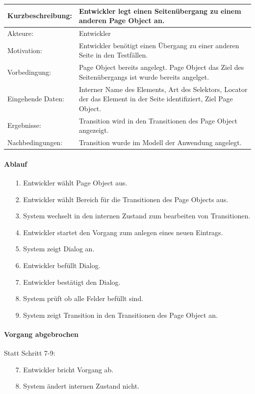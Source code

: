 \begin{tabular}[h]{|p{4cm}|p{}|}
\hline 
\rule[-1ex]{0pt}{2.5ex}Kurzbeschreibung: & 
Entwickler legt einen Seitenübergang zu einem anderen Page Object an. \\  
\hline 
\rule[-1ex]{0pt}{2.5ex}Akteure: & 
Entwickler \\ 
\hline 
\rule[-1ex]{0pt}{2.5ex}Motivation: & 
Entwickler benötigt einen Übergang zu einer anderen Seite in den Testfällen. \\ 
\hline 
\rule[-1ex]{0pt}{2.5ex}Vorbedingung: & 
Page Object bereits angelegt. Page Object das Ziel des Seitenübergangs ist wurde bereits angelget.\\ 
\hline 
\rule[-1ex]{0pt}{2.5ex}Eingehende Daten: & Interner Name des Elements, Art des Selektors, Locator der das Element in der Seite identifiziert, Ziel Page Object. \\ 
\hline 
\rule[-1ex]{0pt}{2.5ex}Ergebnisse: & Transition wird in den Transitionen des Page Object angezeigt. \\ 
\hline 
\rule[-1ex]{0pt}{2.5ex}Nachbedingungen: & Transition wurde im Modell der Anwendung angelegt.  \\ 
\hline 
\end{tabular} 

\paragraph{Ablauf}

\begin{itemize}[itemsep=0pt]
\item[1.] Entwickler wählt Page Object aus.
\item[2.] Entwickler wählt Bereich für die Transitionen des Page Objects aus. 
\item[3.] System wechselt in den internen Zustand zum bearbeiten von Transitionen.
\item[4.] Entwickler startet den Vorgang zum anlegen eines neuen Eintrags.
\item[5.] System zeigt Dialog an. 
\item[6.] Entwickler befüllt Dialog.
\item[7.] Entwickler bestätigt den Dialog.
\item[8.] System prüft ob alle Felder befüllt sind.
\item[9.] System zeigt Transition in den Transitionen des Page Object an.
\end{itemize}

\paragraph{Vorgang abgebrochen}
Statt Schritt 7-9:
\begin{itemize}[itemsep=0pt]
\item[7.] Entwickler bricht Vorgang ab. 
\item[8.] System ändert internen Zustand nicht. 
\end{itemize}

